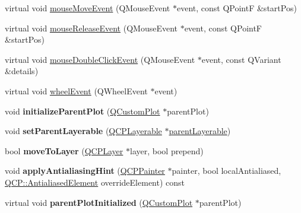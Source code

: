 \begin{DoxyCompactItemize}
virtual void \hyperlink{class_q_c_p_layerable_a9eee1ba47fd69be111059ca3881933e4}{mouse\+Move\+Event} (Q\+Mouse\+Event $\ast$event, const Q\+PointF \&start\+Pos)
\item 
virtual void \hyperlink{class_q_c_p_layerable_aa0d79b005686f668622bbe66ac03ba2c}{mouse\+Release\+Event} (Q\+Mouse\+Event $\ast$event, const Q\+PointF \&start\+Pos)
\item 
virtual void \hyperlink{class_q_c_p_layerable_a4171e2e823aca242dd0279f00ed2de81}{mouse\+Double\+Click\+Event} (Q\+Mouse\+Event $\ast$event, const Q\+Variant \&details)
\item 
virtual void \hyperlink{class_q_c_p_layerable_a47dfd7b8fd99c08ca54e09c362b6f022}{wheel\+Event} (Q\+Wheel\+Event $\ast$event)
\item 
\mbox{\label{class_q_c_p_layerable_a8cbe5a0c9a5674249982f5ca5f8e02bc}} 
void {\bfseries initialize\+Parent\+Plot} (\hyperlink{class_q_custom_plot}{Q\+Custom\+Plot} $\ast$parent\+Plot)
\item 
\mbox{\label{class_q_c_p_layerable_aa23c893671f1f6744ac235cf2204cf3a}} 
void {\bfseries set\+Parent\+Layerable} (\hyperlink{class_q_c_p_layerable}{Q\+C\+P\+Layerable} $\ast$\hyperlink{class_q_c_p_layerable_aa78b7e644d2c519e1a9a6f2ac5fcd858}{parent\+Layerable})
\item 
\mbox{\label{class_q_c_p_layerable_af94484cfb7cbbddb7de522e9be71d9a4}} 
bool {\bfseries move\+To\+Layer} (\hyperlink{class_q_c_p_layer}{Q\+C\+P\+Layer} $\ast$layer, bool prepend)
\item 
\mbox{\label{class_q_c_p_layerable_acb663e375d2d36dc5c55021ee5a2119b}} 
void {\bfseries apply\+Antialiasing\+Hint} (\hyperlink{class_q_c_p_painter}{Q\+C\+P\+Painter} $\ast$painter, bool local\+Antialiased, \hyperlink{namespace_q_c_p_ae55dbe315d41fe80f29ba88100843a0c}{Q\+C\+P\+::\+Antialiased\+Element} override\+Element) const
\item 
\mbox{\label{class_q_c_p_layerable_ac504c8a0075c2fefbf941c4e599d218c}} 
virtual void {\bfseries parent\+Plot\+Initialized} (\hyperlink{class_q_custom_plot}{Q\+Custom\+Plot} $\ast$parent\+Plot)
\item 
\mbox{\label{class_q_c_p_layerable_ae6857c38a001ba0c0c7fcdd99714ae51}} 

\end{DoxyCompactItemize}

